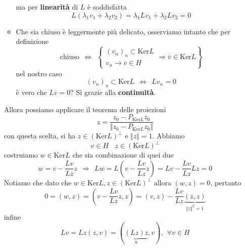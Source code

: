 \begin{dimostrazione}
\begin{itemize}
\begin{itemize}
                        ma per \textbf{linearità} di $L$ è soddisfatta
                        \begin{equation*}
                            L(\lambda _{1} v_{1} +\lambda _{2} v_{2}) =\lambda _{1} Lv_{1} +\lambda _{2} Lv_{2} =0
                        \end{equation*}
                  \item Che sia chiuso è leggermente più delicato, osserviamo intanto che per definizione
                        \begin{equation*}
                            \text{chiuso} \ \ \Leftrightarrow \ \ \left\{
                            \begin{array}{ l }
                                (v_{n})_{n} \subset \mathrm{Ker} L \\
                                v_{n}\rightarrow \overline{v} \in H
                            \end{array} \Rightarrow \overline{v} \in \mathrm{Ker} L\right\}
                        \end{equation*}nel nostro caso
                        \begin{equation*}
                            (v_{n})_{n} \subset \mathrm{Ker} L\ \ \Leftrightarrow \ \ Lv_{n} =0
                        \end{equation*}è vero che $L\overline{v} =0$? Sì grazie alla \textbf{continuità}.
              \end{itemize}

              Allora possiamo applicare il teorema delle proiezioni
              \begin{equation*}
                  z=\frac{z_{0} -P_{\mathrm{Ker} L} z_{0}}{\Vert z_{0} -P_{\mathrm{Ker} L} z_{0}\Vert }
              \end{equation*}con questa scelta, si ha $\boxed{z\in (\mathrm{Ker} L)^{\perp }}$ e $\Vert z\Vert =1$. Abbiamo
              \begin{equation*}
                  v\in H\ \ \ \ z\in (\mathrm{Ker} L)^{\perp }
              \end{equation*}costruiamo $\boxed{w\in \mathrm{Ker} L}$ che sia combinazione di quei due
              \begin{equation*}
                  w=v-\frac{Lv}{Lz} z\ \ \Rightarrow \ \ Lw=L\left(v-\frac{Lv}{Lz} z\right) =Lv-\frac{Lv}{Lz} Lz=0
              \end{equation*}Notiamo che dato che $w\in \mathrm{Ker} L,z\in (\mathrm{Ker} L)^{\perp }$ allora $(w,z) =0$, pertanto
              \begin{equation*}
                  0=(w,z) =\left(v-\frac{Lv}{Lz} z,z\right) =(v,z) -\frac{Lv}{Lz}\underbrace{(z,z)}_{\Vert z\Vert ^{2} =1}
              \end{equation*}infine
              \begin{equation*}
                  Lv=Lz(z,v) =(\underbrace{(Lz) z}_{u},v),\ \ \forall v\in H
              \end{equation*}
    \end{itemize}


\end{dimostrazione}
